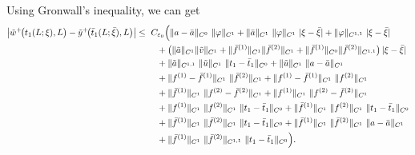 \documentclass[a4paper,reqno,11pt]{amsart}
\numberwithin{equation}{section} %
\begin{document}
Using Gronwall's inequality, we can get
\[
\begin{aligned}
\bigl|\tilde w^+\!\bigl(t_1(L;\xi),L\bigr)-\tilde y ^+\!\bigl(\bar t_1(L;\bar\xi),L\bigr)\bigr|
\le{}&\ C_{\varepsilon_0}\Bigl(
  \|a-\bar a\|_{C^{0}}\ \|\varphi\|_{C^{1}}
  + \|\bar a\|_{C^{1}}\ \|\varphi\|_{C^{1}}\ |\xi-\bar\xi|
  + \|\varphi\|_{C^{1,1}}\ |\xi-\bar\xi|
\\
&\quad
  + \bigl(\|\tilde a\|_{C^{1}}\|\tilde v\|_{C^{1}}
     + \|\bar f^{(1)}\|_{C^{1}}\|\bar f^{(2)}\|_{C^{1}}
     + \|\bar f^{(1)}\|_{C^{0}}\|\bar f^{(2)}\|_{C^{1,1}}\bigr)\,|\xi-\bar\xi|
\\
&\quad
  + \|\tilde a\|_{C^{1,1}}\ \|\tilde u\|_{C^{1}}\ \|t_1-\bar t_1\|_{C^{0}}
  + \|\tilde u\|_{C^{1}}\ \|a-\bar a\|_{C^{1}}
\\
&\quad
  + \|f^{(1)}-\bar f^{(1)}\|_{C^{1}}\ \|\bar f^{(2)}\|_{C^{1}}
  + \|f^{(1)}-\bar f^{(1)}\|_{C^{1}}\ \|f^{(2)}\|_{C^{1}}
\\
&\quad
  + \|\bar f^{(1)}\|_{C^{1}}\ \|f^{(2)}-\bar f^{(2)}\|_{C^{1}}
  + \|f^{(1)}\|_{C^{1}}\ \|f^{(2)}-\bar f^{(2)}\|_{C^{1}}
\\
&\quad
  + \|f^{(1)}\|_{C^{1}}\ \|f^{(2)}\|_{C^{1}}\ \|t_1-\bar t_1\|_{C^{0}}
  + \|\bar f^{(1)}\|_{C^{1}}\ \|f^{(2)}\|_{C^{1}}\ \|t_1-\bar t_1\|_{C^{0}}
\\
&\quad
  + \|\bar f^{(1)}\|_{C^{1}}\ \|\bar f^{(2)}\|_{C^{1}}\ \|t_1-\bar t_1\|_{C^{0}}
  + \|\bar f^{(1)}\|_{C^{1}}\ \|\bar f^{(2)}\|_{C^{1}}\ \|a-\bar a\|_{C^{1}}
\\
&\quad
  + \|\bar f^{(1)}\|_{C^{1}}\ \|\bar f^{(2)}\|_{C^{1,1}}\ \|t_1-\bar t_1\|_{C^{0}}
\Bigr).
\end{aligned}
\]
\end{document}
